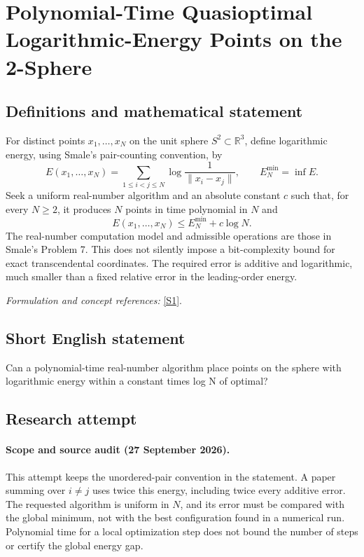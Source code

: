 \documentclass[11pt]{article}
\begin{document}
\section*{\texorpdfstring{Polynomial-Time Quasioptimal Logarithmic-Energy Points on the 2-Sphere}{Polynomial-Time Quasioptimal Logarithmic-Energy Points on the 2-Sphere}}\label{474}
\subsection{Definitions and mathematical statement}
For distinct points $x_1,\ldots,x_N$ on the unit sphere $S^2\subset{\mathbb{R}}^3$, define logarithmic energy, using Smale's pair-counting convention, by
\[
 E(x_1,\ldots,x_N)=\sum_{1\le i<j\le N}
 \log\frac1{\|x_i-x_j\|},\qquad E_N^{\min}=\inf E.
\]
Seek a uniform real-number algorithm and an absolute constant $c$ such that, for every $N\ge2$, it produces $N$ points in time polynomial in $N$ and
\[
 E(x_1,\ldots,x_N)\le E_N^{\min}+c\log N.
\]
The real-number computation model and admissible operations are those in Smale's Problem 7. This does not silently impose a bit-complexity bound for exact transcendental coordinates. The required error is additive and logarithmic, much smaller than a fixed relative error in the leading-order energy.
\par\smallskip\textit{Formulation and concept references:} \href{https://www.cityu.edu.hk/ma/doc/people/smales/pap104.pdf}{[S1]}.

\subsection{Short English statement}
Can a polynomial-time real-number algorithm place points on the sphere with logarithmic energy within a constant times log N of optimal?
\subsection{Research attempt}
\paragraph{Scope and source audit (27 September 2026).}
This attempt keeps the unordered-pair convention in the statement. A
paper summing over $i\ne j$ uses twice this energy, including twice every
additive error. The requested algorithm is uniform in $N$, and its error
must be compared with the global minimum, not with the best configuration
found in a numerical run. Polynomial time for a local optimization step
does not bound the number of steps or certify the global energy gap.
\end{document}
